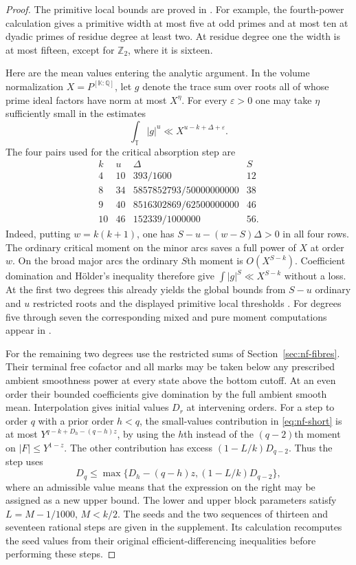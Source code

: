 \documentclass[11pt,letterpaper]{article}
\theoremstyle{definition}
\numberwithin{equation}{section}
\begin{document}
\begin{proof}
The primitive local bounds are proved in \cite[Theorem~4.1]{NFSmallSupplement}.
For example, the fourth-power calculation gives a primitive width
at most five at odd primes and at most ten at dyadic primes of
residue degree at least two. At residue degree one the width is at
most fifteen, except for $\mathbb Z_2$, where it is sixteen.

Here are the mean values entering the analytic argument. In the volume
normalization $X=P^{[\mathbb K:\mathbb Q]}$, let $g$ denote the trace sum
over roots all of whose prime ideal factors have norm at most $X^\eta$.
For every $\varepsilon>0$ one may take $\eta$ sufficiently small in
the estimates
\[
 \int_{\mathbb T}|g|^u\ll X^{u-k+\Delta+\varepsilon}.
\]
The four pairs used for the critical absorption step are
\[
\begin{array}{c|r|l|r}
 k&u&\Delta&S\\\hline
 4&10&393/1600&12\\
 8&34&5857852793/50000000000&38\\
 9&40&8516302869/62500000000&46\\
 10&46&152339/1000000&56 .
\end{array}
\]
Indeed, putting $w=k(k+1)$, one has
$S-u-(w-S)\Delta>0$ in all four rows. The ordinary critical moment
on the minor arcs saves a full power of $X$ at order $w$. On the
broad major arcs the ordinary $S$th moment is $O(X^{S-k})$.
Coefficient domination and H\"older's inequality therefore give
$\int|g|^S\ll X^{S-k}$ without a loss. At the first two degrees this
already yields the global bounds from $S-u$ ordinary and $u$
restricted roots and the displayed primitive local thresholds
\cite[Lemmas~3.1--3.2, Theorem~3.3 and Sections~10, 14]{NFSmallSupplement}.
For degrees five through seven the corresponding mixed and pure
moment computations appear in \cite[Sections~11--13]{NFSmallSupplement}.

For the remaining two degrees use the restricted sums of
Section~\ref{sec:nf-fibres}. Their terminal free cofactor and all marks
may be taken below any prescribed ambient smoothness power at every
state above the bottom cutoff. At an even order their bounded
coefficients give domination by the full ambient smooth mean.
Interpolation gives initial values $D_r$ at intervening orders.
For a step to order $q$ with a prior order $h<q$, the small-values
contribution in \eqref{eq:nf-short} is at most
$Y^{q-k+D_h-(q-h)z}$, by using the $h$th instead of the $(q-2)$th
moment on $|F|\le Y^{1-z}$. The other contribution has excess
$(1-L/k)D_{q-2}$. Thus the step uses
\[
 D_q\le \max\{D_h-(q-h)z,(1-L/k)D_{q-2}\},
\]
where an admissible value means that the expression on the right
may be assigned as a new upper bound. The lower and upper block
parameters satisfy $L=M-1/1000$, $M<k/2$.
The seeds and the two sequences of thirteen and seventeen rational
steps are given in the supplement. Its calculation recomputes the
seed values from their original efficient-differencing inequalities
before performing these steps.


\end{proof}
\end{document}
